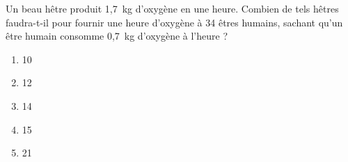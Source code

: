 Un beau hêtre produit 1,7~kg d'oxygène en une heure. Combien de tels hêtres faudra-t-il pour fournir une heure d'oxygène à 34 êtres humains, sachant qu'un être humain consomme 0,7~kg d'oxygène à l'heure ?
\begin{multicols}{5}
  \begin{enumerate}[A/]
  \item 10
  \item 12
  \item 14
  \item 15
  \item 21
  \end{enumerate}
\end{multicols}